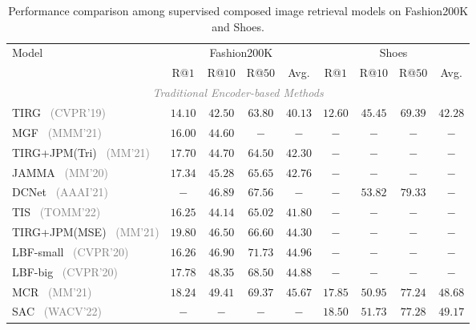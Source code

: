 \begin{table*}
    \scriptsize
    \centering
    \caption{Performance comparison among supervised composed image retrieval models on Fashion200K and Shoes.}
    \begin{tabular}{l|ccc|c|ccc|c}
    \hline 
    \multirow{2}{*}{Model} & \multicolumn{4}{c|}{Fashion200K} & \multicolumn{4}{c}{Shoes}  \\
    \cline{2-9}
    & R@$1$ & R@$10$ & R@$50$ & Avg. & R@$1$ & R@$10$ & R@$50$ & Avg.\\
    \hline \hline 
    
    \multicolumn{9}{c}{\textit{\textcolor{gray}{Traditional Encoder-based Methods}}} \\
    TIRG~\cite{vo2019tirg} \footnotesize{\textcolor{gray}{(CVPR'19)}} & $14.10$ & $42.50$ & $63.80$ &$40.13$ &$12.60$ &$45.45$ & $69.39$&$42.28$\\
    MGF~\cite{liu2021mgf} \footnotesize{\textcolor{gray}{(MMM'21)}} & $16.00$ & $44.60$ & $-$ &$-$ &$-$ &$-$ & $-$&$-$ \\
    TIRG+JPM(Tri)~\cite{yang2021jpm} \footnotesize{\textcolor{gray}{(MM'21)}} & $17.70$ & $44.70$ & $64.50$ &$42.30$ &$-$ &$-$ & $-$&$-$\\
    JAMMA~\cite{zhang2020jamma} \footnotesize{\textcolor{gray}{(MM'20)}} & $17.34$ & $45.28$ & $65.65$ &$42.76$ &$-$ &$-$ & $-$&$-$\\
    DCNet~\cite{kim2021dcnet} \footnotesize{\textcolor{gray}{(AAAI'21)}} & $-$ & $46.89$ & $67.56$ &$-$ & $-$ & $53.82$ & $79.33$ & $-$ \\
    TIS~\cite{zhang2022tis} \footnotesize{\textcolor{gray}{(TOMM'22)}} & $16.25$ & $44.14$ & $65.02$ &$41.80$ &$-$ &$-$ & $-$&$-$\\
    TIRG+JPM(MSE)~\cite{yang2021jpm} \footnotesize{\textcolor{gray}{(MM'21)}} & $19.80$ & $46.50$ & $66.60$ &$44.30$ &$-$ &$-$ & $-$&$-$\\
    LBF-small~\cite{hosseinzadeh2020lbf} \footnotesize{\textcolor{gray}{(CVPR'20)}} & $16.26$ & $46.90$ & $71.73$ &$44.96$ &$-$ &$-$ & $-$&$-$\\
    LBF-big~\cite{hosseinzadeh2020lbf} \footnotesize{\textcolor{gray}{(CVPR'20)}} & $17.78$ & $48.35$ & $68.50$ &$44.88$ &$-$ &$-$ & $-$&$-$\\
    MCR~\cite{zhang2021mcr} \footnotesize{\textcolor{gray}{(MM'21)}} & $18.24$ & $49.41$ & $69.37$ &$45.67$ & $17.85$ & $50.95$ & $77.24$ & $48.68$ \\
    SAC~\cite{jandial2022sac} \footnotesize{\textcolor{gray}{(WACV'22)}} &$-$ &$-$ & $-$&$-$& $18.50$ & $51.73$ & $77.28$ & $49.17$ \\

\end{tabular}
\end{table*}
